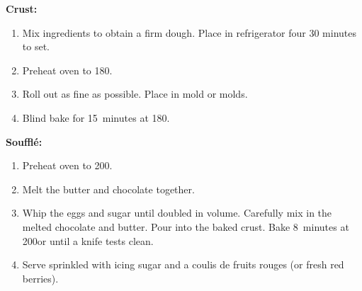 
\textbf{Crust:}

\begin{ingredients}
\end{ingredients}

\begin{recipe}
  \begin{enumerate}

  \item Mix ingredients to obtain a firm dough.  Place in refrigerator
    four 30 minutes to set.

  \item Preheat oven to 180\C.

  \item Roll out as fine as possible.  Place in mold or molds.

  \item Blind bake for 15~minutes at 180\C.

  \end{enumerate}
\end{recipe}


\textbf{Souffl\'e:}

\begin{ingredients}
\end{ingredients}


\begin{recipe}
  \begin{enumerate}

  \item Preheat oven to 200\C.
    
  \item Melt the butter and chocolate together.

  \item Whip the eggs and sugar until doubled in volume.  Carefully
    mix in the melted chocolate and butter.  Pour into the baked
    crust.  Bake 8~minutes at 200\C or until a knife tests clean.

  \item Serve sprinkled with icing sugar and a coulis de fruits rouges
    (or fresh red berries).

  \end{enumerate}
\end{recipe}
